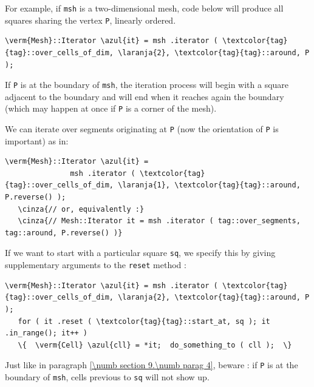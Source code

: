 For example, if {\small\tt msh} is a two-dimensional mesh, code below will produce
all squares sharing the vertex {\small\tt P}, linearly ordered.

\begin{Verbatim}[commandchars=\\\{\},formatcom=\small\tt,
   baselinestretch=0.94,framesep=2mm                      ]
   \verm{Mesh}::Iterator \azul{it} = msh .iterator ( \textcolor{tag}{tag}::over_cells_of_dim, \laranja{2}, \textcolor{tag}{tag}::around, P );
\end{Verbatim}

If {\small\tt P} is at the boundary of {\small\tt msh}, the iteration process will begin
with a square adjacent to the boundary and will end when it reaches again the boundary
(which may happen at once if {\small\tt P} is a corner of the mesh).

We can iterate over segments originating at {\small\tt P} (now the orientation of
{\small\tt P} is important) as in:

\begin{Verbatim}[commandchars=\\\{\},formatcom=\small\tt,
   baselinestretch=0.94,framesep=2mm                      ]
   \verm{Mesh}::Iterator \azul{it} = 
               msh .iterator ( \textcolor{tag}{tag}::over_cells_of_dim, \laranja{1}, \textcolor{tag}{tag}::around, P.reverse() );
   \cinza{// or, equivalently :}
   \cinza{// Mesh::Iterator it = msh .iterator ( tag::over_segments, tag::around, P.reverse() )}
\end{Verbatim}

If we want to start with a particular square {\small\tt sq}, we specify this by giving
supplementary arguments to the {\small\tt reset} method :

\begin{Verbatim}[commandchars=\\\{\},formatcom=\small\tt,
   baselinestretch=0.94,framesep=2mm                      ]
   \verm{Mesh}::Iterator \azul{it} = msh .iterator ( \textcolor{tag}{tag}::over_cells_of_dim, \laranja{2}, \textcolor{tag}{tag}::around, P );
   for ( it .reset ( \textcolor{tag}{tag}::start_at, sq ); it .in_range(); it++ )
   \{  \verm{Cell} \azul{cll} = *it;  do_something_to ( cll );  \}
\end{Verbatim}

Just like in paragraph \ref{\numb section 9.\numb parag 4}, beware : if {\small\tt P}
is at the boundary of {\small\tt msh}, cells previous to {\small\tt sq} will not
show up.

